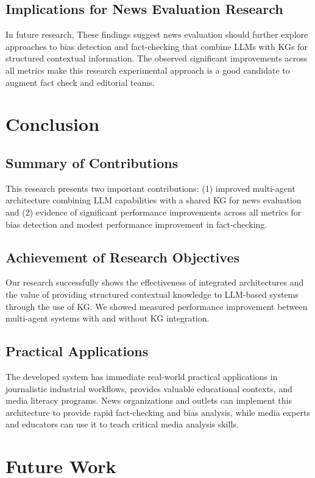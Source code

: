 \documentclass{scrartcl}
\begin{document}
\subsection{Implications for News Evaluation Research}
In future research, These findings suggest news evaluation should further explore approaches to bias detection and fact-checking that combine LLMs with KGs for structured contextual information. The observed significant improvements across all metrics make this research experimental approach is a good candidate to augment fact check and editorial teams.

\section{Conclusion}
\subsection{ Summary of Contributions}
This research presents two important contributions: (1) improved multi-agent architecture combining LLM capabilities with a shared KG for news evaluation and (2) evidence of significant performance improvements across all metrics for bias detection and modest performance improvement in fact-checking. 

\subsection{Achievement of Research Objectives}
Our research successfully shows the effectiveness of integrated architectures and the value of providing structured contextual knowledge to LLM-based systems through the use of KG. We showed measured performance improvement between multi-agent systems with and without KG integration.

\subsection{Practical Applications}
The developed system has immediate real-world practical applications in journalistic industrial workflows, provides valuable educational contexts, and media literacy programs. News organizations and outlets can implement this architecture to provide rapid fact-checking and bias analysis, while media experts and educators can use it to teach critical media analysis skills.


\section{Future Work}
\end{document}
